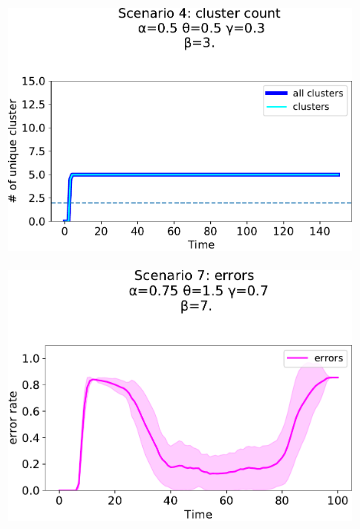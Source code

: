 \begin{figure}[!ht]
\begin{subfigure}[b]{0.32\textwidth}
    \includegraphics[width=\textwidth]{papers/swarm-intelligence2021/img/simulations/overlay_0_021_α-0.5_θ-0.5_γ-0.3_β-3._ω-0._ζ-0..pdf}
  \end{subfigure}
  \begin{subfigure}[b]{0.32\textwidth}
    \centering
    \includegraphics[width=\textwidth]{papers/swarm-intelligence2021/img/simulations/standard-updatable-errors_0_08_α-0.75_θ-0.5_γ-0.1_β-5._ω-0._ζ-0..pdf}
  \end{subfigure}
  \hfill
  \begin{subfigure}[b]{0.32\textwidth}
    \centering

\end{subfigure}
\end{figure}
